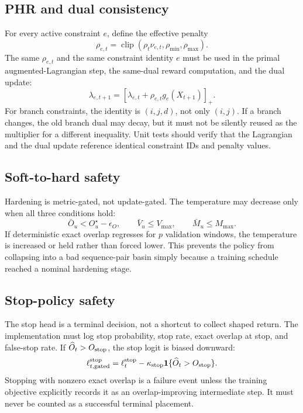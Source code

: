 \documentclass[11pt]{article}
\newcommand{\one}{\mathbf{1}}
\begin{document}
\subsection{PHR and dual consistency}

For every active constraint $e$, define the effective penalty
\[
    \rho_{e,t}=\operatorname{clip}(\rho_t\nu_{e,t},\rho_{\min},\rho_{\max}).
\]
The same $\rho_{e,t}$ and the same constraint identity $e$ must be used in the primal augmented-Lagrangian step, the same-dual reward computation, and the dual update:
\[
    \lambda_{e,t+1}=[\lambda_{e,t}+\rho_{e,t}g_e(X_{t+1})]_+.
\]
For branch constraints, the identity is $(i,j,d)$, not only $(i,j)$. If a branch changes, the old branch dual may decay, but it must not be silently reused as the multiplier for a different inequality. Unit tests should verify that the Lagrangian and the dual update reference identical constraint IDs and penalty values.

\subsection{Soft-to-hard safety}

Hardening is metric-gated, not update-gated. The temperature may decrease only when all three conditions hold:
\[
    \bar O_u < O_u^{\star}-\epsilon_O,
    \qquad
    \bar V_u \le V_{\max},
    \qquad
    \bar M_u \le M_{\max}.
\]
If deterministic exact overlap regresses for $p$ validation windows, the temperature is increased or held rather than forced lower. This prevents the policy from collapsing into a bad sequence-pair basin simply because a training schedule reached a nominal hardening stage.

\subsection{Stop-policy safety}

The stop head is a terminal decision, not a shortcut to collect shaped return. The implementation must log stop probability, stop rate, exact overlap at stop, and false-stop rate. If $\widehat O_t>O_{\rm stop}$, the stop logit is biased downward:
\[
    \ell_{t,{\rm gated}}^{\rm stop}
    =\ell_t^{\rm stop}-\kappa_{\rm stop}\one\{\widehat O_t>O_{\rm stop}\}.
\]
Stopping with nonzero exact overlap is a failure event unless the training objective explicitly records it as an overlap-improving intermediate step. It must never be counted as a successful terminal placement.
\end{document}
